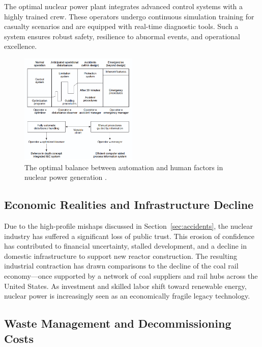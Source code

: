 \documentclass[12pt]{article}
\begin{document}
The optimal nuclear power plant integrates advanced control systems with a highly trained crew. These operators undergo continuous simulation training for casualty scenarios and are equipped with real-time diagnostic tools. Such a system ensures robust safety, resilience to abnormal events, and operational excellence.

\begin{figure}[H]
  \centering
  \includegraphics[width=0.5\textwidth]{optimalautomation.png}
  \caption{The optimal balance between automation and human factors in nuclear power generation \autocite{moderninstruments}.}
  \label{fig:optimalautomation}
\end{figure}

\subsection{Economic Realities and Infrastructure Decline}
\label{sec:infrastructure}

Due to the high-profile mishaps discussed in Section~\ref{sec:accidents}, the nuclear industry has suffered a significant loss of public trust. This erosion of confidence has contributed to financial uncertainty, stalled development, and a decline in domestic infrastructure to support new reactor construction. The resulting industrial contraction has drawn comparisons to the decline of the coal rail economy—once supported by a network of coal suppliers and rail hubs across the United States. As investment and skilled labor shift toward renewable energy, nuclear power is increasingly seen as an economically fragile legacy technology.

\subsection{Waste Management and Decommissioning Costs}
\label{sec:wastemanagement}
\end{document}

